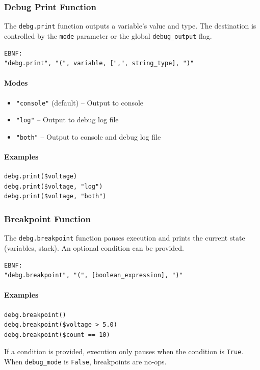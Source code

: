 \subsubsection{Debug Print Function}
The \texttt{debg.print} function outputs a variable's value and type. The destination is controlled by the \texttt{mode} parameter or the global \texttt{debug\_output} flag.
\begin{verbatim}
EBNF:
"debg.print", "(", variable, [",", string_type], ")"
\end{verbatim}

\paragraph{Modes}
\begin{itemize}
\item \texttt{"console"} (default) -- Output to console
\item \texttt{"log"} -- Output to debug log file
\item \texttt{"both"} -- Output to console and debug log file
\end{itemize}

\paragraph{Examples}
\begin{verbatim}
debg.print($voltage)
debg.print($voltage, "log")
debg.print($voltage, "both")
\end{verbatim}

\subsubsection{Breakpoint Function}
The \texttt{debg.breakpoint} function pauses execution and prints the current state (variables, stack). An optional condition can be provided.
\begin{verbatim}
EBNF:
"debg.breakpoint", "(", [boolean_expression], ")"
\end{verbatim}

\paragraph{Examples}
\begin{verbatim}
debg.breakpoint()
debg.breakpoint($voltage > 5.0)
debg.breakpoint($count == 10)
\end{verbatim}

If a condition is provided, execution only pauses when the condition is \texttt{True}. When \texttt{debug\_mode} is \texttt{False}, breakpoints are no-ops.

